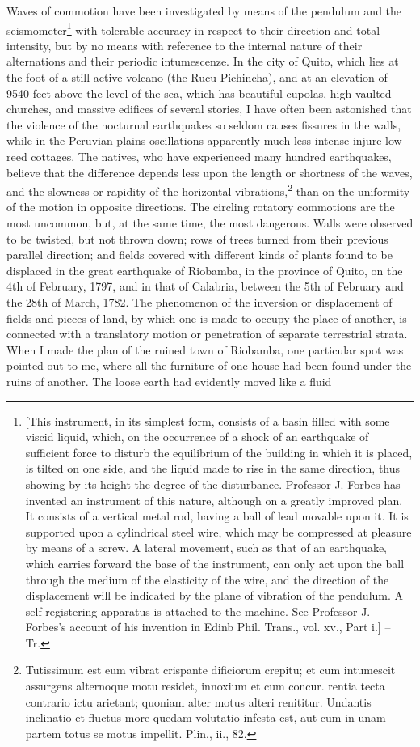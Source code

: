 Waves of commotion have been investigated by means of the pendulum and the seismometer\footnote{[This instrument, in its simplest form, consists of a basin filled with some viscid liquid, which, on the occurrence of a shock of an earthquake of sufficient force to disturb the equilibrium of the building in which it is placed, is tilted on one side, and the liquid made to rise in the same direction, thus showing by its height the degree of the disturbance. Professor J. Forbes has invented an instrument of this nature, although on a greatly improved plan. It consists of a vertical metal rod, having a ball of lead movable upon it. It is supported upon a cylindrical steel wire, which may be compressed at pleasure by means of a screw. A lateral movement, such as that of an earthquake, which carries forward the base of the instrument, can only act upon the ball through the medium of the elasticity of the wire, and the direction of the displacement will be indicated by the plane of vibration of the pendulum. A self-registering apparatus is attached to the machine. See Professor J. Forbes's account of his invention in Edinb Phil. Trans., vol. xv., Part i.] -- Tr.} with tolerable accuracy in respect to their direction and total intensity, but by no means with reference to the internal nature of their alternations and their periodic intumescenze. In the city of Quito, which lies at the foot of a still active volcano (the Rucu Pichincha), and at an elevation of 9540 feet above the level of the sea, which has beautiful cupolas, high vaulted churches, and massive edifices of several stories, I have often been astonished that the violence of the nocturnal earthquakes so seldom causes fissures in the walls, while in the Peruvian plains oscillations apparently much less intense injure low reed cottages. The natives, who have experienced many hundred earthquakes, believe that the difference depends less upon the length or shortness of the waves, and the slowness or rapidity of the horizontal vibrations,\footnote{Tutissimum est eum vibrat crispante dificiorum crepitu; et cum intumescit assurgens alternoque motu residet, innoxium et cum concur. rentia tecta contrario ictu arietant; quoniam alter motus alteri renititur. Undantis inclinatio et fluctus more quedam volutatio infesta est, aut cum in unam partem totus se motus impellit. Plin., ii., 82.} than on the uniformity of the motion in opposite directions. The circling rotatory commotions are the most uncommon, but, at the same time, the most dangerous. Walls were observed to be twisted, but not thrown down; rows of trees turned from their previous parallel direction; and fields covered with different kinds of plants found to be displaced in the great earthquake of Riobamba, in the province of Quito, on the 4th of February, 1797, and in that of Calabria, between the 5th of February and the 28th of March, 1782. The phenomenon of the inversion or displacement of fields and pieces of land, by which one is made to occupy the place of another, is connected with a translatory motion or penetration of separate terrestrial strata. When I made the plan of the ruined town of Riobamba, one particular spot was pointed out to me, where all the furniture of one house had been found under the ruins of another. The loose earth had evidently moved like a fluid 